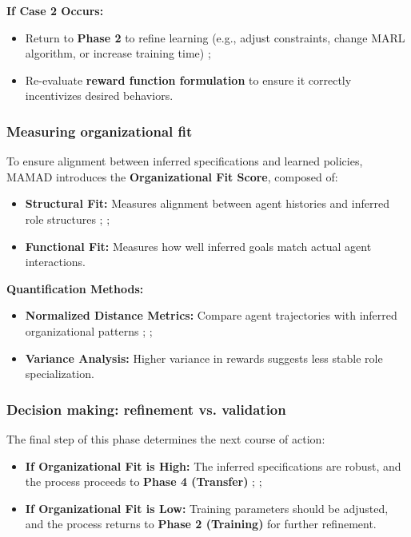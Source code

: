 \documentclass[pdflatex,sn-mathphys-num]{sn-jnl}%
\theoremstyle{thmstyleone}%
\theoremstyle{thmstyletwo}%
\theoremstyle{thmstylethree}%
\begin{document}
\noindent \textbf{If Case 2 Occurs:}
\begin{itemize}
    \item Return to \textbf{Phase 2} to refine learning (e.g., adjust constraints, change MARL algorithm, or increase training time) ;
    \item Re-evaluate \textbf{reward function formulation} to ensure it correctly incentivizes desired behaviors.
\end{itemize}

\subsubsection{Measuring organizational fit}
To ensure alignment between inferred specifications and learned policies, MAMAD introduces the \textbf{Organizational Fit Score}, composed of:

\begin{itemize}
    \item \textbf{Structural Fit:} Measures alignment between agent histories and inferred role structures ; ;
    \item \textbf{Functional Fit:} Measures how well inferred goals match actual agent interactions.
\end{itemize}

\noindent \textbf{Quantification Methods:}
\begin{itemize}
    \item \textbf{Normalized Distance Metrics:} Compare agent trajectories with inferred organizational patterns ; ;
    \item \textbf{Variance Analysis:} Higher variance in rewards suggests less stable role specialization.
\end{itemize}

\subsubsection{Decision making: refinement vs. validation}
The final step of this phase determines the next course of action:

\begin{itemize}
    \item \textbf{If Organizational Fit is High:} The inferred specifications are robust, and the process proceeds to \textbf{Phase 4 (Transfer)} ; ;
    \item \textbf{If Organizational Fit is Low:} Training parameters should be adjusted, and the process returns to \textbf{Phase 2 (Training)} for further refinement.
\end{itemize}
\end{document}
